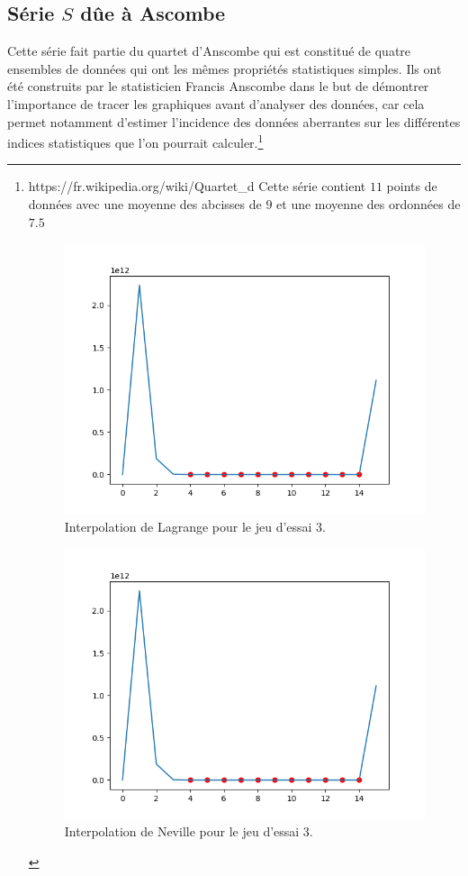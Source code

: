 \documentclass[12pt,french,titlepage]{article}
\begin{document}
	\subsection{Série $S$ dûe à Ascombe}
	Cette série fait partie du quartet d'Anscombe qui est constitué de quatre ensembles de données qui ont les mêmes propriétés statistiques simples. Ils ont été construits par le statisticien Francis Anscombe dans le but de démontrer l'importance de tracer les graphiques avant d'analyser des données, car cela permet notamment d'estimer l'incidence des données aberrantes sur les différentes indices statistiques que l'on pourrait calculer.\footnote{https://fr.wikipedia.org/wiki/Quartet_d%
	Cette série contient $11$ points de données avec une moyenne des abcisses de $9$ et une moyenne des ordonnées de $7.5$
		\begin{figure}[H]
		\includegraphics[width=\textwidth]{"31.png"}
		\caption{Interpolation de Lagrange pour le jeu d'essai 3.}
		\end{figure}
		
		\begin{figure}[H]
		\includegraphics[width=\textwidth]{"32.png"}
		\caption{Interpolation de Neville pour le jeu d'essai 3.}
		\end{figure}
		
}
\end{document}
